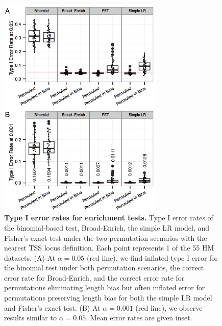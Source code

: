 \begin{figure}[ht!]
\centering
\includegraphics[width=0.7\textwidth]{chap2figs/figure2_4.pdf}
\caption[Type I error rates for enrichment tests.]
{
\textbf{Type I error rates for enrichment tests.} Type I error rates of the binomial-based test, Broad-Enrich, the simple LR model, and Fisher's exact test under the two permutation scenarios with the nearest TSS locus definition. Each point represents 1 of the 55 HM datasets. (A) At $\alpha = 0.05$  (red line), we find inflated type I error for the binomial test under both permutation scenarios, the correct error rate for Broad-Enrich, and the correct error rate for permutations eliminating length bias but often inflated error for permutations preserving length bias for both the simple LR model and Fisher's exact test. (B) At $\alpha = 0.001$ (red line), we observe results similar to $\alpha = 0.05$. Mean error rates are given inset.
}
\label{chap2:fig:4}
\end{figure}

\newpage

